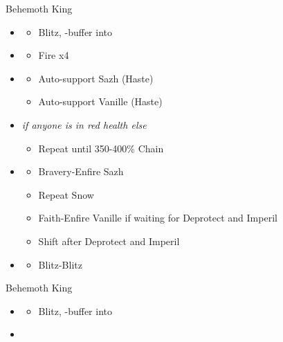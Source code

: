 \begin{paracol}{2}
\begin{battle}{Behemoth King}
	\begin{itemize}
		\item \second
		      \begin{itemize}
			      \item Blitz, \rav-buffer into
		      \end{itemize}
		\item \sixth
		      \begin{itemize}
			      \item Fire x4
		      \end{itemize}
		\item \fourth
		      \begin{itemize}
			      \item Auto-support Sazh (Haste)
			      \item Auto-support Vanille (Haste)
		      \end{itemize}
		\item \fifth \textit{if anyone is in red health else} \sixth
		      \begin{itemize}
			      \item Repeat until 350-400\% Chain
		      \end{itemize}
		\item \third
		      \begin{itemize}
			      \item Bravery-Enfire Sazh
			      \item Repeat Snow
			      \item Faith-Enfire Vanille if waiting for Deprotect and Imperil
			      \item Shift after Deprotect and Imperil
		      \end{itemize}
		\item \second
		      \begin{itemize}
			      \item Blitz-Blitz
		      \end{itemize}
	\end{itemize}
\end{battle}
\switchcolumn
\begin{battle}{Behemoth King}
\begin{itemize}
    \item \second
    \begin{itemize}
        \item Blitz, \rav-buffer into
    \end{itemize}
    \item \sixth

\end{itemize}
\end{battle}
\end{paracol}

